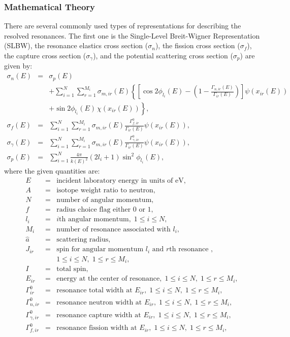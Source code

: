 \subsubsection{Mathematical Theory}
There are several commonly used types of representations for describing the resolved resonances. The first one is the Single-Level Breit-Wigner Representation (SLBW), the resonance elastics cross section ($\sigma_n$), the fission cross section ($\sigma_f$), the capture cross section ($\sigma_\gamma$), and the potential scattering cross section ($\sigma_p$) are given by:
\begin{eqnarray}
\sigma_n (E) &=& \sigma_p(E) \nonumber\\[1ex]
&& + \sum_{i=1}^{N} \sum_{r=1}^{M_i} \sigma_{m,ir}(E)\left\{\left[\cos2\phi_{l_i}(E)-(1-\frac{\Gamma_{n,ir}(E)}{\Gamma_{ir}(E)})\right]\psi(x_{ir}(E))\right.\nonumber\\
&& \left. + \sin2\phi_{l_i}(E)\frac{}{}\chi(x_{ir}(E))\right\}, \\
\sigma_{f} (E) &=& \sum_{i=1}^{N}\sum_{r=1}^{M_i} \sigma_{m,ir}(E) \frac{\Gamma_{f,ir}^0}{\Gamma_{ir}(E)} \psi(x_{ir}(E)),\\
\sigma_{\gamma}(E) &=&  \sum_{i=1}^{N}\sum_{r=1}^{M_i} \sigma_{m,ir}(E) \frac{\Gamma_{\gamma,ir}^0}{\Gamma_{ir}(E)} \psi(x_{ir}(E)),\\
\sigma_p (E) &=& \sum_{i=1}^{N} \frac{4\pi}{k(E)^2}(2l_i+1)\sin^2\phi_{l_i}(E),
\end{eqnarray}
where the given quantities are:
\begin{eqnarray}
E &=& \mbox{incident laboratory energy in units of eV},\\
A &=& \mbox{isotope weight ratio to neutron}, \\
N &=& \mbox{number of angular momentum}, \\
f &=& \mbox{radius choice flag either 0 or 1}, \\
l_i &=& i\mbox{th angular momentum},\; 1\leq i\leq N,\\
M_i &=& \mbox{number of resonance associated with }l_i,\\ 
\hat{a} &=& \mbox{scattering radius}, \\
J_{ir} &=& \mbox{spin for angular momentum }l_i\mbox{ and $r$th resonance }, \nonumber\\
&&1\leq i\leq N,\;1\leq r\leq M_i,\\
I &=& \mbox{total spin},\\
E_{ir} &=& \mbox{energy at the center of resonance},  \;1\leq i\leq N,\;1\leq r\leq M_i,\\
\Gamma_{ir}^0 &=& \mbox{resonance total width at } E_{ir}, \;1\leq i\leq N,\;1\leq r\leq M_i,\\
\Gamma_{n,ir}^0 &=& \mbox{resonance neutron width at } E_{ir}, \;1\leq i\leq N,\;1\leq r\leq M_i,\\
\Gamma_{\gamma,ir}^0 &=& \mbox{resonance capture width at } E_{ir}, \;1\leq i\leq N,\;1\leq r\leq M_i,\\
\Gamma_{f,ir}^0 &=& \mbox{resonance fission width at } E_{ir}, \;1\leq i\leq N,\;1\leq r\leq M_i,
\end{eqnarray}
